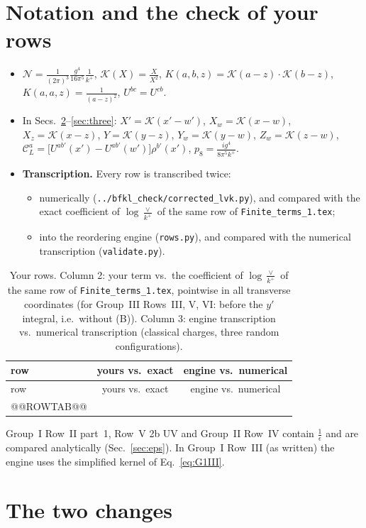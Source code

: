 \documentclass[10pt]{article}
\numberwithin{equation}{section}
\newcommand{\KK}{\mathcal K}
\newcommand{\CL}{\mathcal C_L}
\newcommand{\NN}{\mathcal N}
\newcommand{\pre}{\frac{1}{(2\pi)^3}}
\begin{document}
\section{Notation and the check of your rows}\label{sec:notation}
\begin{itemize}
\item $\NN=\pre\frac{g^4}{16\pi^5}\frac1{k^+}$, $\KK(X)=\frac{X}{X^2}$, $K(a,b,z)=\KK(a-z)\cdot\KK(b-z)$, $K(a,a,z)=\frac{1}{(a-z)^2}$, $U^{bc}=U^{cb}$.
\item In Secs.~\ref{sec:changes}--\ref{sec:three}: $X'=\KK(x'-w')$, $X_w=\KK(x-w)$, $X_z=\KK(x-z)$, $Y=\KK(y-z)$, $Y_w=\KK(y-w)$, $Z_w=\KK(z-w)$, $\CL^a=\big[U^{ab'}(x')-U^{ab'}(w')\big]\rho^{b'}(x')$, $p_8=\frac{ig^4}{8\pi^5k^+}$.
\item \textbf{Transcription.} Every row is transcribed twice:
\begin{itemize}
\item numerically (\texttt{../bfkl\_check/corrected\_lvk.py}), and compared with the exact coefficient of $\log\frac{\vee}{k^+}$ of the same row of \texttt{Finite\_terms\_1.tex};
\item into the reordering engine (\texttt{rows.py}), and compared with the numerical transcription (\texttt{validate.py}).
\end{itemize}
\end{itemize}
\begin{longtable}{@{}lcc@{}}
\caption{Your rows. Column 2: your term vs.\ the coefficient of $\log\frac{\vee}{k^+}$ of the same row of \texttt{Finite\_terms\_1.tex}, pointwise in all transverse coordinates (for Group~III Rows~III, V, VI: before the $y'$ integral, i.e.\ without (B)). Column 3: engine transcription vs.\ numerical transcription (classical charges, three random configurations).}\label{tab:rows}\\
\toprule row & yours vs.\ exact & engine vs.\ numerical\\\midrule\endfirsthead
\toprule row & yours vs.\ exact & engine vs.\ numerical\\\midrule\endhead
@@ROWTAB@@
\bottomrule
\end{longtable}
\noindent Group~I Row~II part~1, Row~V 2b UV and Group~II Row~IV contain $\frac1\epsilon$ and are compared analytically (Sec.~\ref{sec:eps}). In Group~I Row~III (as written) the engine uses the simplified kernel of Eq.~\eqref{eq:G1III}.

\section{The two changes}\label{sec:changes}
\end{document}
